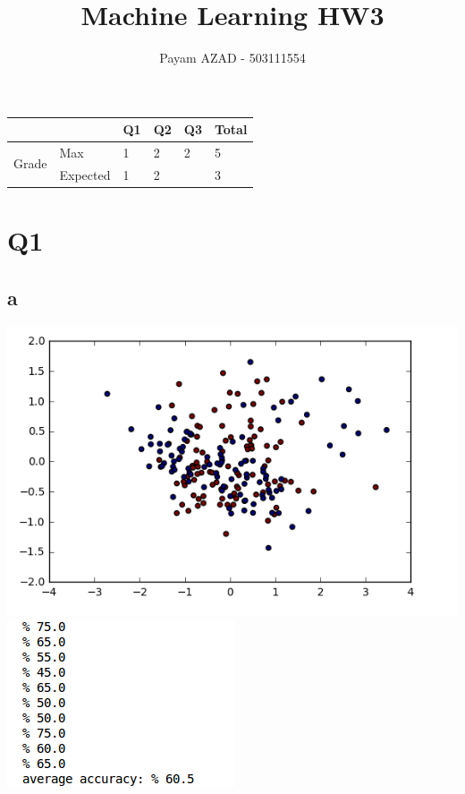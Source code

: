 \documentclass[11]{article}
\title{Machine Learning HW3}
\author{Payam AZAD - 503111554}
\begin{document}
 \maketitle
 
 \begin{table}[ht!]
\centering
\label{my-label}
\begin{tabular}{|ll|l|l|l|l|}
\hline
                                             &          & Q1 & Q2 & Q3 & Total \\ \hline
\multicolumn{1}{|l|}{\multirow{2}{*}{Grade}} & Max      & 1  & 2  & 2  &  5     \\ \cline{2-6} 
\multicolumn{1}{|l|}{}                       & Expected & 1  & 2 &   & 3   \\ \hline
\end{tabular}
\end{table}


\section*{Q1}
\subsection*{a}
\includegraphics[scale=0.75]{1.png} \\
\includegraphics[scale=0.75]{res1.png} \\
\end{document}
